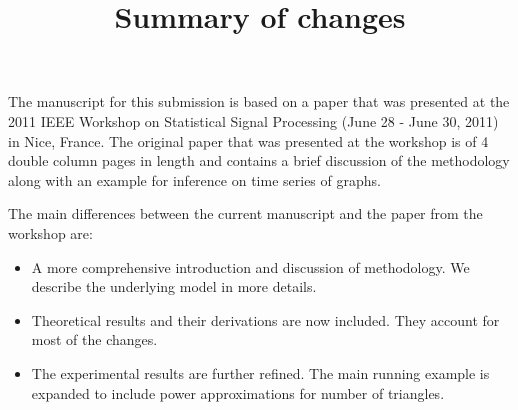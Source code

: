 \documentclass{article}
\begin{document}
\title{Summary of changes}
\maketitle
The manuscript for this submission is based on a paper that
was presented at the 2011 IEEE Workshop on Statistical Signal
Processing (June 28 - June 30, 2011) in Nice, France. The original
paper that was presented at the workshop is of 4 double column pages
in length and contains a brief discussion of the methodology along
with an example for inference on time series of graphs.

The main differences between the current manuscript and the paper from the
workshop are:
\begin{itemize}
\item A more comprehensive introduction and discussion of
  methodology. We describe the underlying model in more details.
\item Theoretical results and their derivations are now included. They
  account for most of the changes.
\item The experimental results are further refined. The main running example
  is expanded to include power approximations for number of triangles.
\end{itemize}
\end{document}
